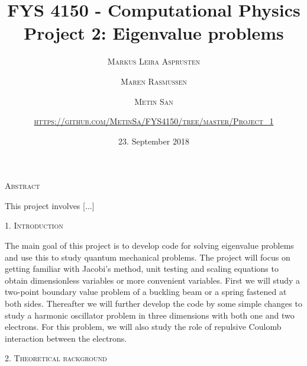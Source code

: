 \documentclass[a4paper,10pt]{article}
\title{FYS 4150 - Computational Physics\\
 Project 2: Eigenvalue problems
}
\date{\normalsize{23. September 2018} }
\author{\textsc{\small{Markus Leira Asprusten}}
\and \textsc{\small{Maren Rasmussen}}\and \textsc{\small{Metin San}} \and
\textsc{\small\url{https://github.com/MetinSa/FYS4150/tree/master/Project_1}}
 }
\begin{document}
\maketitle

\begin{center}
\textsc{Abstract}
\end{center}

\begin{adjustwidth}{7mm}{7mm}

This project involves [...]

\end{adjustwidth}



\bigskip

\begin{center}
\textsc{1. Introduction}
\end{center}
The main goal of this project is to develop code for solving eigenvalue problems and use this to study quantum mechanical problems. The project will focus on getting familiar with Jacobi's method, unit testing and scaling equations to obtain dimensionless variables or more convenient variables. First we will study a two-point boundary value problem of a buckling beam or a spring fastened at both sides. Thereafter we will further develop the code by some simple changes to study a harmonic oscillator problem in three dimensions with both one and two electrons. For this problem, we will also study the role of repulsive Coulomb interaction between the electrons. 


\bigskip
\begin{center}
\textsc{2. Theoretical background}
\end{center}
\end{document}

